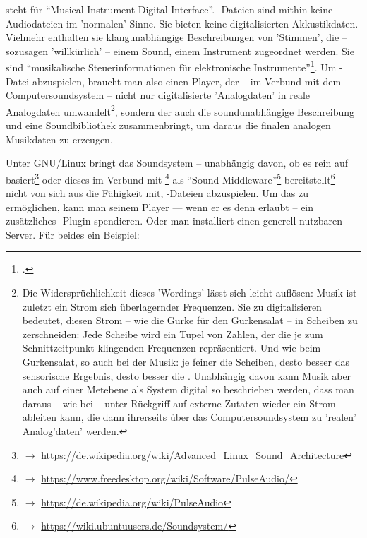  steht für \enquote{Musical Instrument Digital Interface}.
-Dateien sind mithin keine Audiodateien im 'normalen' Sinne. Sie
bieten keine digitalisierten Akkustikdaten. Vielmehr enthalten sie
klangunabhängige Beschreibungen von 'Stimmen', die -- sozusagen 'willkürlich' --
einem Sound, einem Instrument zugeordnet werden. Sie sind \enquote{musikalische
Steuerinformationen für elektronische Instrumente}\footcite[vgl. dazu][\nopage
wp]{WpedMidi2019a}. Um -Datei abzuspielen, braucht man also einen
Player, der -- im Verbund mit dem Computersoundsystem -- nicht nur
digitalisierte 'Analogdaten' in reale Analogdaten umwandelt\footnote{Die
Widersprüchlichkeit dieses 'Wordings' lässt sich leicht auflösen:
Musik ist zuletzt ein Strom sich überlagernder Frequenzen. Sie zu digitalisieren
bedeutet, diesen Strom -- wie die Gurke für den Gurkensalat -- in Scheiben zu
zerschneiden: Jede Scheibe wird ein Tupel von Zahlen, der die je zum
Schnittzeitpunkt klingenden Frequenzen repräsentiert. Und wie beim Gurkensalat,
so auch bei der Musik: je feiner die Scheiben, desto besser das sensorische
Ergebnis, desto besser die . Unabhängig davon
kann Musik aber auch auf einer Metebene als System digital so beschrieben
werden, dass man daraus -- wie bei  -- unter Rückgriff auf externe
Zutaten wieder ein Strom  ableiten kann, die
dann ihrerseits über das Computersoundsystem zu 'realen' Analog'daten' werden.},
sondern der auch die soundunabhängige Beschreibung und eine Soundbibliothek
zusammenbringt, um daraus die finalen analogen Musikdaten zu erzeugen.

Unter GNU/Linux bringt das Soundsystem -- unabhängig davon, ob es rein auf
 basiert\footnote{$\rightarrow$
\href{https://de.wikipedia.org/wiki/Advanced{\_}Linux{\_}Sound{\_}Architecture}
{https://de.wikipedia.org/wiki/Advanced{\_}Linux{\_}Sound{\_}Architecture}} oder
dieses im Verbund mit \footnote{$\rightarrow$
\href{https://www.freedesktop.org/wiki/Software/PulseAudio/}
{https://www.freedesktop.org/wiki/Software/PulseAudio/}} als
\enquote{Sound-Middleware}\footnote{$\rightarrow$
\href{https://de.wikipedia.org/wiki/PulseAudio}
{https://de.wikipedia.org/wiki/PulseAudio}} bereitstellt\footnote{$\rightarrow$
\href{https://wiki.ubuntuusers.de/Soundsystem/}{https://wiki.ubuntuusers.de/Soundsystem/}}
-- nicht von sich aus die Fähigkeit mit, -Dateien abzuspielen.
Um das zu ermöglichen, kann man seinem Player --- wenn er es denn erlaubt -- ein
zusätzliches -Plugin spendieren. Oder man installiert einen generell
nutzbaren -Server. Für beides ein Beispiel:

